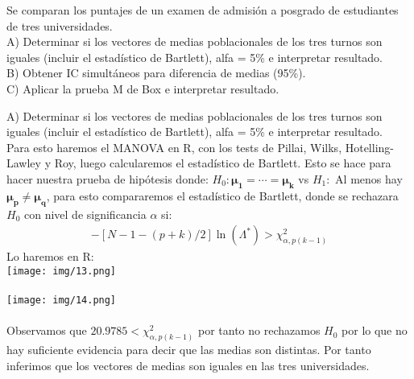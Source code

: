 \begin{problem}{4}
Se comparan los puntajes de un examen de admisión a posgrado de estudiantes de tres universidades.\\
A) Determinar si los vectores de medias poblacionales de los tres turnos son iguales (incluir el
estadístico de Bartlett), alfa = 5\% e interpretar resultado.\\
B) Obtener IC simultáneos para diferencia de medias (95\%).\\
C) Aplicar la prueba M de Box e interpretar resultado.
\end{problem}
\begin{sol}
A) Determinar si los vectores de medias poblacionales de los tres turnos son iguales (incluir el
estadístico de Bartlett), alfa = 5\% e interpretar resultado.\\
Para esto haremos el MANOVA en R, con los tests de Pillai, Wilks, Hotelling-Lawley y Roy, luego calcularemos el estadístico de Bartlett. Esto se hace para hacer nuestra prueba de hipótesis donde:
$H_0:\bm{\mu_1}=\cdots = \bm{\mu_k}$ vs $H_1:$ Al menos hay $\bm{\mu_p} \neq \bm{\mu_q}$, para esto compararemos el estadístico de Bartlett, donde se rechazara $H_0$ con nivel de significancia $\alpha$ si:
\begin{align*}
-[N-1-(p+k)/2]\ln{(\Lambda^*)}>\chi_{\alpha,p(k-1)}^2
\end{align*}
Lo haremos en R:\\
\texttt{[image: img/13.png]}\\\\
\texttt{[image: img/14.png]}\\\\
Observamos que $20.9785 < \chi_{\alpha,p(k-1)}^2$ por tanto no rechazamos $H_0$ por lo que no hay suficiente evidencia para decir que las medias son distintas. Por tanto inferimos que los vectores de medias son iguales en las tres universidades.


\end{sol}
